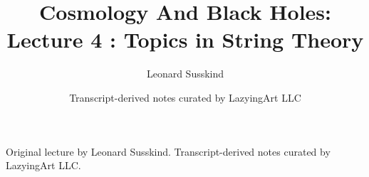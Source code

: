 \documentclass[11pt,oneside]{book}
\begin{document}
\frontmatter
\title{Cosmology And Black Holes: Lecture 4 : Topics in String Theory}
\author{Leonard Susskind}
\date{Transcript-derived notes curated by LazyingArt LLC}
\maketitle
\begin{center}
\small Original lecture by Leonard Susskind. Transcript-derived notes curated by LazyingArt LLC.
\end{center}
\clearpage
\mainmatter

\end{document}
